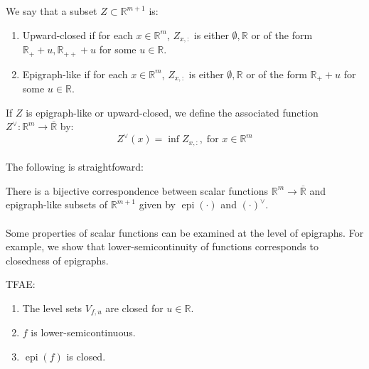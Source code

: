 \begin{defn}
	\label{defn:021-ucset-assfunc}
	We say that a subset $Z\subset \mathbb{R}^{m+1}$ is:
	\begin{enumerate}[label=(\alph*)]
		\item Upward-closed if for each $x\in \mathbb{R}^m$, $Z_{x,:}$ is either $\emptyset,\mathbb{R}$ or of the form $\mathbb{R}_++u,\mathbb{R}_{++}+u$ for some $u\in \mathbb{R}$.
		\item Epigraph-like if for each $x\in \mathbb{R}^m$, $Z_{x,:}$ is either $\emptyset,\mathbb{R}$ or of the form $\mathbb{R}_++u$ for some $u\in \mathbb{R}$.
	\end{enumerate}
	If $Z$ is epigraph-like or upward-closed, we define the associated function $Z^\vee:\mathbb{R}^m\to \overline{\mathbb{R}}$ by:
	\[
		Z^\vee(x)=\inf Z_{x,:},\;\text{for }x\in \mathbb{R}^m
	\]

\end{defn}

\paragraph{}The following is straightfoward:

\begin{prop}
	\label{prop:021-epi-corr-set}
	There is a bijective correspondence between scalar functions $\mathbb{R}^m\to \overline{\mathbb{R}}$ and epigraph-like subsets of $\mathbb{R}^{m+1}$ given by $\operatorname{epi}(\cdot)$ and $(\cdot)^\vee$.
\end{prop}

\paragraph{}Some properties of scalar functions can be examined at the level of epigraphs. For example, we show that lower-semicontinuity of functions corresponds to closedness of epigraphs.
\begin{prop}
	\label{prop:021-epi-lsc}
	TFAE:
	\begin{enumerate}[label=(\roman*)]
		\item The level sets $V_{f,u}$ are closed for $u\in \mathbb{R}$.
		\item $f$ is lower-semicontinuous.
		\item $\operatorname{epi}(f)$ is closed.
	\end{enumerate}
\end{prop}

